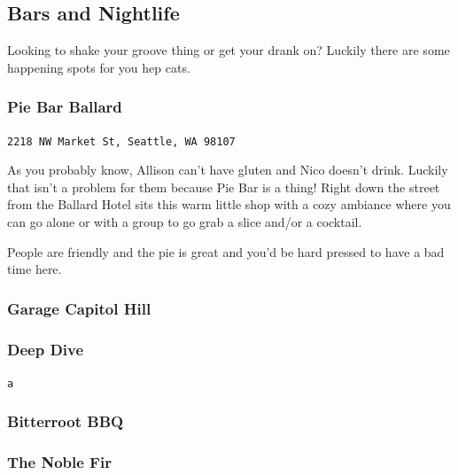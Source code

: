 \documentclass[12pt]{article}
\begin{document}
\noindent\hrulefill 

\subsection{Bars and Nightlife}
Looking to shake your groove thing or get your drank on? Luckily there are some happening
spots for you hep cats.
\subsubsection{Pie Bar Ballard}
\begin{center}
    \texttt{2218 NW Market St, Seattle, WA 98107}
\end{center}

As you probably know, Allison can't have gluten and Nico doesn't drink. Luckily that isn't a problem 
for them because Pie Bar is a thing! Right down the street from the Ballard Hotel sits this warm
little shop with a cozy ambiance where you can go alone or with a group to go grab a slice and/or a cocktail.

People are friendly and the pie is great and you'd be hard pressed to have a bad time here.

\subsubsection{Garage Capitol Hill}

\subsubsection{Deep Dive}
\begin{center}
    \texttt{a}
\end{center}

\subsubsection{Bitterroot BBQ}

\subsubsection{The Noble Fir}
\end{document}
